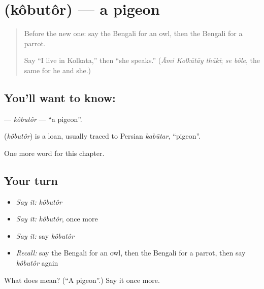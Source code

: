 \section[\texorpdfstring{\bn{কবুতর} (kôbutôr)}{কবুতর (kôbutôr)}]{ (kôbutôr) — a pigeon}

\label{lesson:BN-C121-kobutor}



\begin{quote}
Before the new one: say the Bengali for an owl, then the Bengali for a parrot.

Say \textquotedblleft{}I live in Kolkata,\textquotedblright{} then \textquotedblleft{}she speaks.\textquotedblright{} (\emph{Āmi Kolkātāy thāki}; \emph{se bôle}, the same for he and she.)
\end{quote}

\subsection*{You'll want to know: }
\textbf{} — \emph{kôbutôr} — \textquotedblleft{}a pigeon\textquotedblright{}.

\begin{cousinweb}
\textbf{} (\emph{kôbutôr}) is a loan, usually traced to Persian \emph{kabūtar}, \textquotedblleft{}pigeon\textquotedblright{}.
\end{cousinweb}

\begin{grammarlens}[title={What you've built}]
One more word for this chapter.
\end{grammarlens}

\subsection*{Your turn}
\begin{itemize}
\raggedright
  \item \emph{Say it:} \emph{kôbutôr}
  \item \emph{Say it:} \emph{kôbutôr}, once more
  \item \emph{Say it:} say \emph{kôbutôr}
  \item \emph{Recall:} say the Bengali for an owl, then the Bengali for a parrot, then say \emph{kôbutôr} again
\end{itemize}

\begin{tcolorbox}[breakable,colback=teal!4,colframe=teal!35!black,title={Before you move on}]
What does  mean? (\textquotedblleft{}A pigeon\textquotedblright{}.) Say it once more.
\end{tcolorbox}
